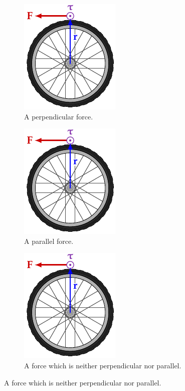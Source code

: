 \documentclass[oneside]{book}
\begin{document}
\begin{itemize}
    \begin{figure}[H]
        \centering
        \begin{subfigure}[c]{0.3\textwidth}
            \centering
            \includegraphics[page=1]{../images/torque/torque.pdf}
            \caption{A perpendicular force.}
        \end{subfigure}%
        \begin{subfigure}[c]{0.3\textwidth}
            \centering
            \includegraphics[page=2]{../images/torque/torque.pdf}
            \caption{A parallel force.}
        \end{subfigure}%
        \begin{subfigure}[c]{0.3\textwidth}
            \centering
            \includegraphics[page=3]{../images/torque/torque.pdf}
            \caption{A force which is neither perpendicular nor parallel.}
        \end{subfigure}%

\end{figure}
\end{itemize}
\end{document}
